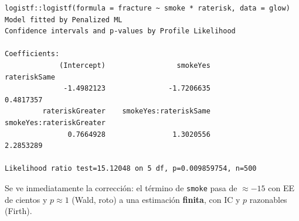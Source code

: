 \documentclass[
  letterpaper,
  DIV=11,
  numbers=noendperiod]{scrartcl}
\begin{document}
\begin{verbatim}
logistf::logistf(formula = fracture ~ smoke * raterisk, data = glow)
Model fitted by Penalized ML
Confidence intervals and p-values by Profile Likelihood 

Coefficients:
             (Intercept)                 smokeYes             rateriskSame 
              -1.4982123               -1.7206635                0.4817357 
         rateriskGreater    smokeYes:rateriskSame smokeYes:rateriskGreater 
               0.7664928                1.3020556                2.2853289 

Likelihood ratio test=15.12048 on 5 df, p=0.009859754, n=500
\end{verbatim}

Se ve inmediatamente la corrección: el término de \texttt{smoke} pasa de
\(\approx-15\) con EE de cientos y \(p\approx1\) (Wald, roto) a una
estimación \textbf{finita}, con IC y \(p\) razonables (Firth).
\end{document}
